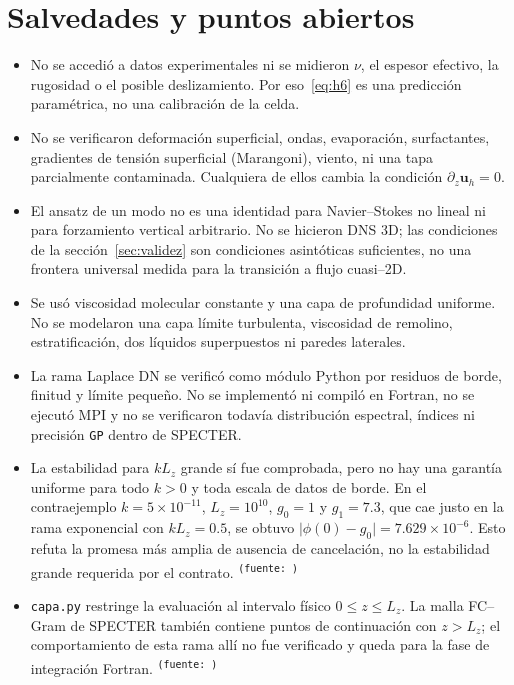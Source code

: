 \documentclass[11pt,a4paper]{article}
\newcommand{\src}[1]{\textsuperscript{\texttt{(fuente: \detokenize{#1})}}}
\begin{document}
\section{Salvedades y puntos abiertos}
\label{sec:salvedades}

\begin{itemize}
\item No se accedió a datos experimentales ni se midieron \(\nu\), el espesor
  efectivo, la rugosidad o el posible deslizamiento. Por eso~\eqref{eq:h6} es una
  predicción paramétrica, no una calibración de la celda.
\item No se verificaron deformación superficial, ondas, evaporación, surfactantes,
  gradientes de tensión superficial (Marangoni), viento, ni una tapa parcialmente
  contaminada. Cualquiera de ellos cambia la condición \(\partial_z\boldsymbol u_h=0\).
\item El ansatz de un modo no es una identidad para Navier--Stokes no lineal ni para
  forzamiento vertical arbitrario. No se hicieron DNS 3D; las condiciones de la
  sección~\ref{sec:validez} son condiciones asintóticas suficientes, no una frontera
  universal medida para la transición a flujo cuasi--2D.
\item Se usó viscosidad molecular constante y una capa de profundidad uniforme. No
  se modelaron una capa límite turbulenta, viscosidad de remolino, estratificación,
  dos líquidos superpuestos ni paredes laterales.
\item La rama Laplace DN se verificó como módulo Python por residuos de borde,
  finitud y límite pequeño. No se implementó ni compiló en Fortran, no se ejecutó
  MPI y no se verificaron todavía distribución espectral, índices ni precisión
  \texttt{GP} dentro de SPECTER.
\item La estabilidad para \(kL_z\) grande sí fue comprobada, pero no hay una
  garantía uniforme para todo \(k>0\) y toda escala de datos de borde. En el
  contraejemplo \(k=5\times10^{-11}\), \(L_z=10^{10}\), \(g_0=1\) y \(g_1=7.3\),
  que cae justo en la rama exponencial con \(kL_z=0.5\), se obtuvo
  \(\lvert\phi(0)-g_0\rvert=7.629\times10^{-6}\). Esto refuta la promesa más
  amplia de ausencia de cancelación, no la estabilidad grande requerida por el
  contrato. \src{limitacion_k_pequeno}
\item \texttt{capa.py} restringe la evaluación al intervalo físico
  \(0\le z\le L_z\). La malla FC--Gram de SPECTER también contiene puntos de
  continuación con \(z>L_z\); el comportamiento de esta rama allí no fue
  verificado y queda para la fase de integración Fortran. \src{fc_gram_pendiente}

\end{itemize}
\end{document}
